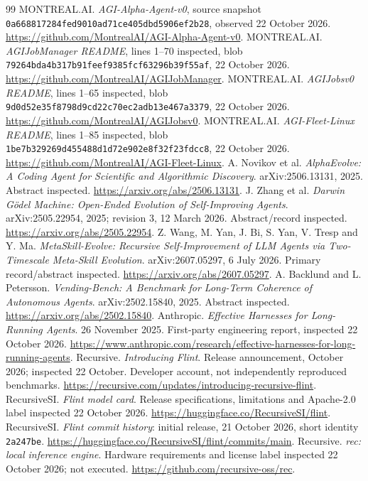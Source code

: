 \documentclass[11pt,letterpaper]{article}
\begin{document}
\begin{thebibliography}{99}
 MONTREAL.AI. \emph{AGI-Alpha-Agent-v0}, source snapshot \nolinkurl{0a668817284fed9010ad71ce405dbd5906ef2b28}, observed 22 October 2026. \url{https://github.com/MontrealAI/AGI-Alpha-Agent-v0}.
 MONTREAL.AI. \emph{AGIJobManager README}, lines 1--70 inspected, blob \nolinkurl{79264bda4b317b91feef9385fcf63296b39f55af}, 22 October 2026. \url{https://github.com/MontrealAI/AGIJobManager}.
 MONTREAL.AI. \emph{AGIJobsv0 README}, lines 1--65 inspected, blob \nolinkurl{9d0d52e35f8798d9cd22c70ec2adb13e467a3379}, 22 October 2026. \url{https://github.com/MontrealAI/AGIJobsv0}.
 MONTREAL.AI. \emph{AGI-Fleet-Linux README}, lines 1--85 inspected, blob \nolinkurl{1be7b329269d455488d1d72e902e8f32f23fdcc8}, 22 October 2026. \url{https://github.com/MontrealAI/AGI-Fleet-Linux}.
 A. Novikov et al. \emph{AlphaEvolve: A Coding Agent for Scientific and Algorithmic Discovery}. arXiv:2506.13131, 2025. Abstract inspected. \url{https://arxiv.org/abs/2506.13131}.
 J. Zhang et al. \emph{Darwin G\"odel Machine: Open-Ended Evolution of Self-Improving Agents}. arXiv:2505.22954, 2025; revision 3, 12 March 2026. Abstract/record inspected. \url{https://arxiv.org/abs/2505.22954}.
 Z. Wang, M. Yan, J. Bi, S. Yan, V. Tresp and Y. Ma. \emph{MetaSkill-Evolve: Recursive Self-Improvement of LLM Agents via Two-Timescale Meta-Skill Evolution}. arXiv:2607.05297, 6 July 2026. Primary record/abstract inspected. \url{https://arxiv.org/abs/2607.05297}.
 A. Backlund and L. Petersson. \emph{Vending-Bench: A Benchmark for Long-Term Coherence of Autonomous Agents}. arXiv:2502.15840, 2025. Abstract inspected. \url{https://arxiv.org/abs/2502.15840}.
 Anthropic. \emph{Effective Harnesses for Long-Running Agents}. 26 November 2025. First-party engineering report, inspected 22 October 2026. \url{https://www.anthropic.com/research/effective-harnesses-for-long-running-agents}.
 Recursive. \emph{Introducing Flint}. Release announcement, October 2026; inspected 22 October. Developer account, not independently reproduced benchmarks. \url{https://recursive.com/updates/introducing-recursive-flint}.
 RecursiveSI. \emph{Flint model card}. Release specifications, limitations and Apache-2.0 label inspected 22 October 2026. \url{https://huggingface.co/RecursiveSI/flint}.
 RecursiveSI. \emph{Flint commit history}: initial release, 21 October 2026, short identity \texttt{2a247be}. \url{https://huggingface.co/RecursiveSI/flint/commits/main}.
 Recursive. \emph{rec: local inference engine}. Hardware requirements and license label inspected 22 October 2026; not executed. \url{https://github.com/recursive-oss/rec}.
\end{thebibliography}
\end{document}
